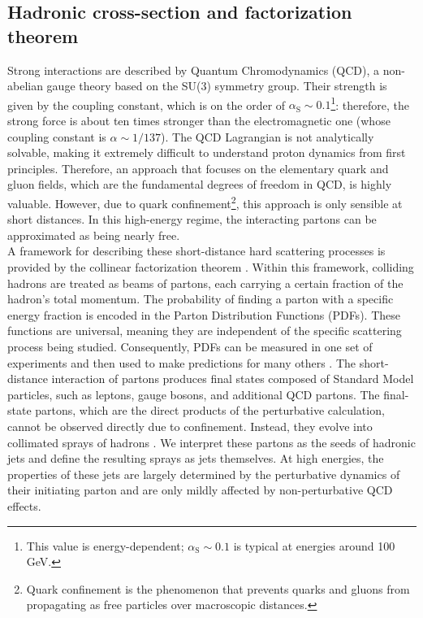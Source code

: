 \documentclass[a4paper, 12pt]{book}
\begin{document}
\subsection{Hadronic cross-section and factorization theorem}
Strong interactions are described by Quantum Chromodynamics (QCD), a non-abelian gauge theory based on the SU(3) symmetry group. Their strength is given by the coupling constant, which is on the order of $\alpha_{\text{S}}\sim0.1$\footnote{This value is energy-dependent; $\alpha_{\text{S}}\sim0.1$ is typical at energies around 100 GeV.}: therefore, the strong force is about ten times stronger than the electromagnetic one (whose coupling constant is $\alpha\sim1/137$). The QCD Lagrangian is not analytically solvable, making it extremely difficult to understand proton dynamics from first principles. Therefore, an approach that focuses on the elementary quark and gluon fields, which are the fundamental degrees of freedom in QCD, is highly valuable. However, due to quark confinement\footnote{Quark confinement is the phenomenon that prevents quarks and gluons from propagating as free particles over macroscopic distances.}, this approach is only sensible at short distances. In this high-energy regime, the interacting partons can be approximated as being nearly free. \\
A framework for describing these short-distance hard scattering processes is provided by the collinear factorization theorem \cite{Collins:1987pm}. Within this framework, colliding hadrons are treated as beams of partons, each carrying a certain fraction of the hadron's total momentum. The probability of finding a parton with a specific energy fraction is encoded in the Parton Distribution Functions (PDFs). These functions are universal, meaning they are independent of the specific scattering process being studied. Consequently, PDFs can be measured in one set of experiments and then used to make predictions for many others \cite{Melnikov2018}. The short-distance interaction of partons produces final states composed of Standard Model particles, such as leptons, gauge bosons, and additional QCD partons. The final-state partons, which are the direct products of the perturbative calculation, cannot be observed directly due to confinement. Instead, they evolve into collimated sprays of hadrons \cite{Salam:2010nqg}. We interpret these partons as the seeds of hadronic jets and define the resulting sprays as jets themselves. At high energies, the properties of these jets are largely determined by the perturbative dynamics of their initiating parton and are only mildly affected by non-perturbative QCD effects. \\
\end{document}
